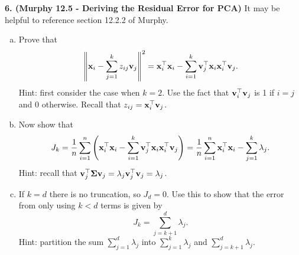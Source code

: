\documentclass[12pt,letterpaper,fleqn]{hmcpset}
\begin{document}
\newpage


\textbf{6. (Murphy 12.5 - Deriving the Residual Error for PCA)} It may be helpful to reference
section 12.2.2 of Murphy.
\begin{enumerate}[(a)]
    \item Prove that
        \[
            \left\|{\bf x}_i - \sum_{j=1}^k z_{ij}{\bf v}_j\right\|^2 = {\bf x}_i^\top{\bf x}_i - \sum_{i=1}^k{\bf v}_j^\top {\bf x}_i{\bf x}_i^\top {\bf v}_j.
        \]
        Hint: first consider the case when $k=2$. Use the fact that ${\bf v}_i^\top{\bf v}_j$ is 1 if $i=j$ and 0 otherwise.
        Recall that $z_{ij} = {\bf x}_i^\top{\bf v}_j$.

    \item Now show that
        \[
            J_k = \frac{1}{n}\sum_{i=1}^n \left({\bf x}_i^\top {\bf x}_i - \sum_{i=1}^k{\bf v}_j^\top {\bf x}_i{\bf x}_i^\top {\bf v}_j\right) = \frac{1}{n}\sum_{i=1}^n {\bf x}_i^\top{\bf x}_i - \sum_{j=1}^k\lambda_j.
        \]
        Hint: recall that ${\bf v}_j^\top \hbox{\boldmath$\Sigma$} {\bf v}_j = \lambda_j{\bf v}_j^\top{\bf v}_j = \lambda_j$.

    \item If $k=d$ there is no truncation, so $J_d=0$. Use this to show that the error from only using $k<d$
        terms is given by
        \[
            J_k = \sum_{j=k+1}^d \lambda_j.
        \]
        Hint: partition the sum $\sum_{j=1}^d \lambda_j$ into $\sum_{j=1}^k \lambda_j$ and $\sum_{j=k+1}^d \lambda_j$.
\end{enumerate}
\end{document}
